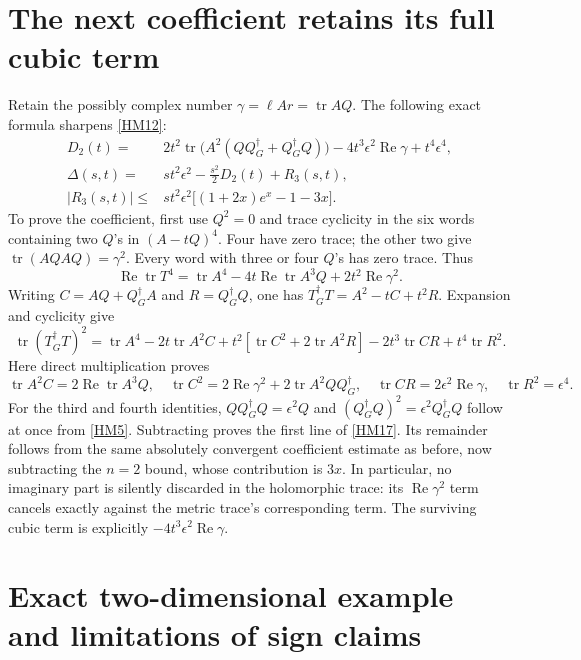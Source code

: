 \documentclass[11pt]{article}
\newcommand{\tr}{\operatorname{tr}}
\newcommand{\adj}{\dagger_G}
\newcommand{\Rea}{\operatorname{Re}}
\begin{document}
\section{The next coefficient retains its full cubic term}

Retain the possibly complex number \(\gamma=\ell Ar=\tr AQ\).
The following exact formula sharpens \eqref{HM12}:
\begin{equation}
 \begin{split}
 D_2(t)={}&2t^2\tr\bigl(A^2(QQ^\adj+Q^\adj Q)\bigr)
       -4t^3\epsilon^2\Rea\gamma+t^4\epsilon^4,\\
 \Delta(s,t)={}&s t^2\epsilon^2-\frac{s^2}{2}D_2(t)+R_3(s,t),\\
 |R_3(s,t)|\le{}&s t^2\epsilon^2
       \bigl[(1+2x)e^x-1-3x\bigr].
 \end{split}
 \tag{HM17}\label{HM17}
\end{equation}
To prove the coefficient, first use \(Q^2=0\) and trace cyclicity in the
six words containing two \(Q\)'s in \((A-tQ)^4\). Four have zero trace;
the other two give \(\tr(AQAQ)=\gamma^2\). Every word with three or four
\(Q\)'s has zero trace. Thus
\[
 \Rea\tr T^4=\tr A^4-4t\Rea\tr A^3Q+2t^2\Rea\gamma^2.
\]
Writing \(C=AQ+Q^\adj A\) and \(R=Q^\adj Q\), one has
\(T^\adj T=A^2-tC+t^2R\). Expansion and cyclicity give
\[
 \tr(T^\adj T)^2=\tr A^4-2t\tr A^2C
  +t^2[\tr C^2+2\tr A^2R]-2t^3\tr CR+t^4\tr R^2.
\]
Here direct multiplication proves
\[
 \tr A^2C=2\Rea\tr A^3Q,\quad
 \tr C^2=2\Rea\gamma^2+2\tr A^2QQ^\adj,
 \quad \tr CR=2\epsilon^2\Rea\gamma,\quad \tr R^2=\epsilon^4.
\]
For the third and fourth identities, \(QQ^\adj Q=\epsilon^2Q\) and
\((Q^\adj Q)^2=\epsilon^2Q^\adj Q\) follow at once from \eqref{HM5}.
Subtracting proves the first line of \eqref{HM17}. Its remainder follows
from the same absolutely convergent coefficient estimate as before, now
subtracting the \(n=2\) bound, whose contribution is \(3x\).
In particular, no imaginary part is silently discarded in the holomorphic
trace: its \(\Rea\gamma^2\) term cancels exactly against the metric trace's
corresponding term. The surviving cubic term is explicitly
\(-4t^3\epsilon^2\Rea\gamma\).

\section{Exact two-dimensional example and limitations of sign claims}
\end{document}
